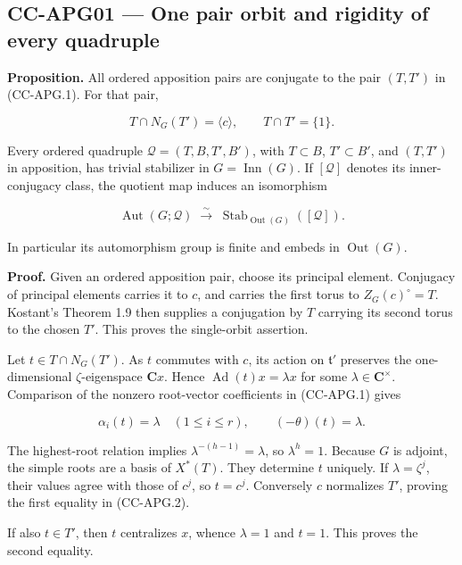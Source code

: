 \subsection{CC-APG01 --- One pair orbit and rigidity of every
quadruple}\label{cc-apg01-one-pair-orbit-and-rigidity-of-every-quadruple}

\textbf{Proposition.} All ordered apposition pairs are conjugate to the
pair \((T,T')\) in (CC-APG.1). For that pair,

\[
 T\cap N_G(T')=\langle c\rangle,\qquad
 T\cap T'=\{1\}.
 \tag{CC-APG.2}
\]

Every ordered quadruple \(\mathcal Q=(T,B,T',B')\), with \(T\subset B\),
\(T'\subset B'\), and \((T,T')\) in apposition, has trivial stabilizer
in \(G=\operatorname{Inn}(G)\). If \([\mathcal Q]\) denotes its
inner-conjugacy class, the quotient map induces an isomorphism

\[
 \operatorname{Aut}(G;\mathcal Q)
 \;\xrightarrow{\ \sim\ }\;
 \operatorname{Stab}_{\operatorname{Out}(G)}([\mathcal Q]).
 \tag{CC-APG.3}
\]

In particular its automorphism group is finite and embeds in
\(\operatorname{Out}(G)\).

\textbf{Proof.} Given an ordered apposition pair, choose its principal
element. Conjugacy of principal elements carries it to \(c\), and
carries the first torus to \(Z_G(c)^\circ=T\). Kostant's Theorem 1.9
then supplies a conjugation by \(T\) carrying its second torus to the
chosen \(T'\). This proves the single-orbit assertion.

Let \(t\in T\cap N_G(T')\). As \(t\) commutes with \(c\), its action on
\(\mathfrak t'\) preserves the one-dimensional \(\zeta\)-eigenspace
\(\mathbf Cx\). Hence \(\operatorname{Ad}(t)x=\lambda x\) for some
\(\lambda\in\mathbf C^\times\). Comparison of the nonzero root-vector
coefficients in (CC-APG.1) gives

\[
 \alpha_i(t)=\lambda\quad(1\leq i\leq r),
 \qquad (-\theta)(t)=\lambda.
\]

The highest-root relation implies \(\lambda^{-(h-1)}=\lambda\), so
\(\lambda^h=1\). Because \(G\) is adjoint, the simple roots are a basis
of \(X^*(T)\). They determine \(t\) uniquely. If \(\lambda=\zeta^j\),
their values agree with those of \(c^j\), so \(t=c^j\). Conversely \(c\)
normalizes \(T'\), proving the first equality in (CC-APG.2).

If also \(t\in T'\), then \(t\) centralizes \(x\), whence \(\lambda=1\)
and \(t=1\). This proves the second equality.

